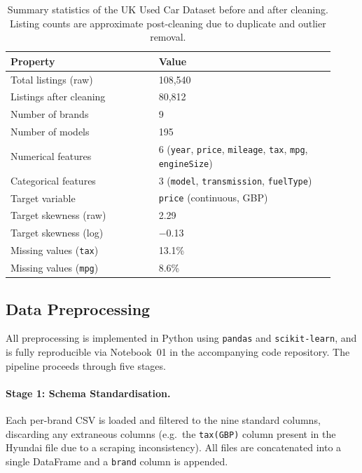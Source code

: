 \begin{table}[h]
\centering
\small
\begin{tabular}{@{}p{0.42\linewidth}p{0.50\linewidth}@{}}
\toprule
\textbf{Property} & \textbf{Value} \\
\midrule
Total listings (raw)          & 108{,}540 \\
Listings after cleaning       & 80{,}812 \\
Number of brands              & 9 \\
Number of models              & 195 \\
Numerical features            & 6 (\texttt{year}, \texttt{price}, \texttt{mileage}, \texttt{tax}, \texttt{mpg}, \texttt{engineSize}) \\
Categorical features          & 3 (\texttt{model}, \texttt{transmission}, \texttt{fuelType}) \\
Target variable               & \texttt{price} (continuous, GBP) \\
Target skewness (raw)         & 2.29 \\
Target skewness (log)         & $-$0.13 \\
Missing values (\texttt{tax}) & 13.1\% \\
Missing values (\texttt{mpg}) & 8.6\% \\
\bottomrule
\end{tabular}
\caption{Summary statistics of the UK Used Car Dataset before and after cleaning. Listing counts are approximate post-cleaning due to duplicate and outlier removal.}
\label{tab:dataset_stats}
\end{table}

\subsection{Data Preprocessing}
\label{sec:preprocessing}

All preprocessing is implemented in Python using \texttt{pandas} and \texttt{scikit-learn}, and is fully reproducible via Notebook~01 in the accompanying code repository.
The pipeline proceeds through five stages.

\paragraph{Stage 1: Schema Standardisation.}
Each per-brand CSV is loaded and filtered to the nine standard columns, discarding any extraneous columns (e.g.\ the \texttt{tax(GBP)} column present in the Hyundai file due to a scraping inconsistency).
All files are concatenated into a single DataFrame and a \texttt{brand} column is appended.

